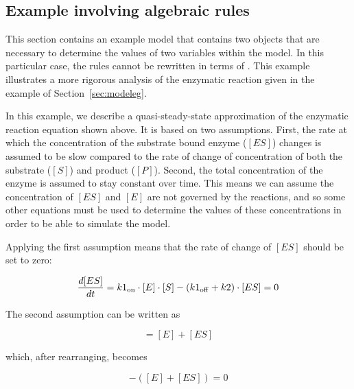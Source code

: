 \subsection{Example involving algebraic rules}
\label{sec:algeraiceg}

This section contains an example model that contains two
\AlgebraicRule objects that are necessary to determine the values
of two variables within the model.  In this particular case, the
rules cannot be rewritten in terms of \AssignmentRule.  This
example illustrates a more rigorous analysis of the enzymatic
reaction given in the example of Section~\ref{sec:modeleg}.
\begin{center}
\end{center}
In this example, we describe a quasi-steady-state approximation of
the enzymatic reaction equation shown above.  It is based on two
assumptions.  First, the rate at which the concentration of the
substrate bound enzyme ($[ES]$) changes is assumed to be slow
compared to the rate of change of concentration of both the
substrate ($[S]$) and product ($[P]$).  Second, the total
concentration of the enzyme is assumed to stay constant over time.
This means we can assume the concentration of $[ES]$ and $[E]$ are
not governed by the reactions, and so some other equations must be
used to determine the values of these concentrations in order to
be able to simulate the model.

Applying the first assumption means that the rate of change of
$[ES]$ should be set to zero:
\begin{linenomath}
\begin{equation*}
  \dfrac{d [ES]}{d t} = k1\sub{on} \cdot [E] \cdot [S] - (k1\sub{off} + k2) \cdot [ES] = 0
\end{equation*}
\end{linenomath}

The second assumption can be written as
\begin{linenomath}
\begin{equation*}
  [E\sub{total}] = [E] + [ES]
\end{equation*}
\end{linenomath}
which, after rearranging, becomes
\begin{linenomath}
\begin{equation*}
  [E\sub{total}] - ([E] + [ES]) = 0
\end{equation*}
\end{linenomath}

